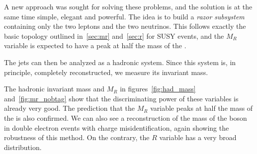A new approach was sought for solving these problems, and the solution is at
the same time simple, elegant and powerful.
The idea is to build a \emph{razor subsystem} containing only the two
leptons and the two neutrinos. This follows exactly the basic topology
outlined in~\ref{sec:mr} and~\ref{sec:r} for SUSY events, and the $M_R$
variable is expected to have a peak at half the mass of the \TP.

The jets can then be analyzed as a hadronic system. Since this system is, in
principle, completely reconstructed, we measure its invariant mass.

The hadronic invariant mass and $M_R$ in figures~\ref{fig:had_mass}
and~\ref{fig:mr_nobtag} show that the discriminating power of these
variables is already very good. The prediction that the $M_R$ variable peaks
at half the mass of the \TP is also confirmed. We can also see a
reconstruction of the mass of the \Z boson in double electron events with
charge misidentification, again showing the robustness of this method.
On the contrary, the $R$ variable has a very
broad distribution.

